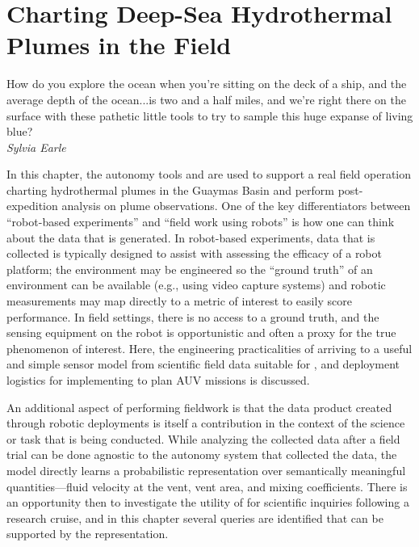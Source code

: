 \chapter{Charting Deep-Sea Hydrothermal Plumes in the Field}
\label{chap:field_results}

\begin{center}
    \begin{minipage}{0.7\textwidth}
      \begin{small}
        How do you explore the ocean when you're sitting on the deck of a ship, and the average depth of the ocean...is two and a half miles, and we're right there on the surface with these pathetic little tools to try to sample this huge expanse of living blue?\\ \emph{Sylvia Earle}
      \end{small}
    \end{minipage}
    \vspace{0.7cm}
\end{center}

In this chapter, the autonomy tools \PHORTEX and \PHUMES are used to support a real field operation charting hydrothermal plumes in the Guaymas Basin and perform post-expedition analysis on plume observations. One of the key differentiators between ``robot-based experiments'' and ``field work using robots'' is how one can think about the data that is generated. In robot-based experiments, data that is collected is typically designed to assist with assessing the efficacy of a robot platform; the environment may be engineered so the ``ground truth'' of an environment can be available (e.g., using video capture systems) and robotic measurements may map directly to a metric of interest to easily score performance. In field settings, there is no access to a ground truth, and the sensing equipment on the robot is opportunistic and often a proxy for the true phenomenon of interest. Here, the engineering practicalities of arriving to a useful and simple sensor model from scientific field data suitable for \PHUMES, and deployment logistics for implementing \PHORTEX to plan AUV \Sentry missions is discussed. 

An additional aspect of performing fieldwork is that the data product created through robotic deployments is itself a contribution in the context of the science or task that is being conducted. While analyzing the collected data after a field trial can be done agnostic to the autonomy system that collected the data, the \PHUMES model directly learns a probabilistic representation over semantically meaningful quantities---fluid velocity at the vent, vent area, and mixing coefficients. There is an opportunity then to investigate the utility of \PHUMES for scientific inquiries following a research cruise, and in this chapter several queries are identified that can be supported by the \PHUMES representation. 

